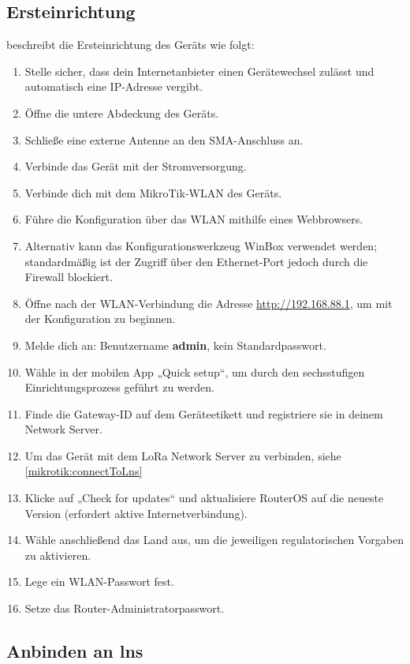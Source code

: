 	\subsection{Ersteinrichtung}
	\textcite{mikrotik:2025z} beschreibt die Ersteinrichtung des Geräts wie folgt:
	
	\begin{enumerate}
		\item Stelle sicher, dass dein Internetanbieter einen Gerätewechsel zulässt und automatisch eine IP-Adresse vergibt.
		\item Öffne die untere Abdeckung des Geräts.
		\item Schlie{\ss}e eine externe Antenne an den SMA-Anschluss an.
		\item Verbinde das Gerät mit der Stromversorgung.
		\item Verbinde dich mit dem MikroTik-WLAN des Geräts.
		\item Führe die Konfiguration über das WLAN mithilfe eines Webbrowsers.
		\item Alternativ kann das Konfigurationswerkzeug WinBox verwendet werden; 
		standardmä{\ss}ig ist der Zugriff über den Ethernet-Port jedoch durch die Firewall blockiert.
		\item Öffne nach der WLAN-Verbindung die Adresse 
		\url{http://192.168.88.1}, um mit der Konfiguration zu beginnen.
		\item Melde dich an: Benutzername \textbf{admin}, kein Standardpasswort.
		\item Wähle in der mobilen App „Quick setup“, um durch den sechs­stufigen Einrichtungsprozess geführt zu werden.
		\item Finde die Gateway-ID auf dem Geräteetikett und registriere sie in deinem Network Server.
		\item Um das Gerät mit dem LoRa Network Server zu verbinden, siehe \autoref{mikrotik:connectToLns}
		\item Klicke auf „Check for updates“ und aktualisiere RouterOS auf die neueste Version (erfordert aktive Internetverbindung).
		\item Wähle anschlie{\ss}end das Land aus, um die jeweiligen regulatorischen Vorgaben zu aktivieren.
		\item Lege ein WLAN-Passwort fest.
		\item Setze das Router-Administratorpasswort.
	\end{enumerate}
	
	
	
	\subsection{Anbinden an \acl{lns} \label{mikrotik:connectToLns}}
	
